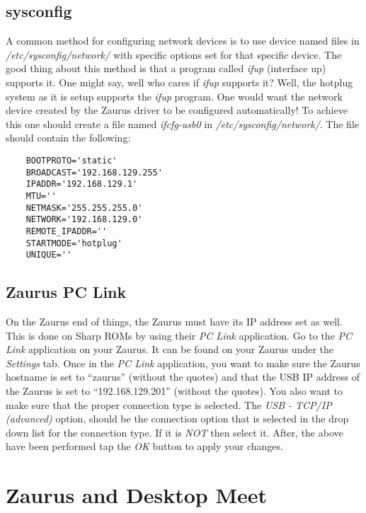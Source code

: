 \documentclass{article}
\begin{document}
    \subsection{sysconfig}

    A common method for configuring network devices is to use device named
    files in \emph{/etc/sysconfig/network/} with specific options set for
    that specific device. The good thing about this method is that a program
    called \emph{ifup} (interface up) supports it. One might say, well who
    cares if \emph{ifup} supports it? Well, the hotplug system as it is
    setup supports the \emph{ifup} program. One would want the network
    device created by the Zaurus driver to be configured
    automatically! To achieve this one should create a file named
    \emph{ifcfg-usb0} in \emph{/etc/sysconfig/network/}. The file should
    contain the following:

    \begin{verbatim}
    BOOTPROTO='static'
    BROADCAST='192.168.129.255'
    IPADDR='192.168.129.1'
    MTU=''
    NETMASK='255.255.255.0'
    NETWORK='192.168.129.0'
    REMOTE_IPADDR=''
    STARTMODE='hotplug'
    UNIQUE=''
    \end{verbatim}

    \subsection{Zaurus PC Link}

    On the Zaurus end of things, the Zaurus must have its IP address set as
    well. This is done on Sharp ROMs by using their \emph{PC Link}
    application. Go to the \emph{PC Link} application on your Zaurus. It can
    be found on your Zaurus under the \emph{Settings} tab. Once in the
    \emph{PC Link} application, you want to make sure the Zaurus hostname is
    set to ``zaurus'' (without the quotes) and that the USB IP address of the
    Zaurus is set to ``192.168.129.201'' (without the quotes). You also want
    to make sure that the proper connection type is selected. The \emph{USB -
    TCP/IP (advanced)} option, should be the connection option that is
    selected in the drop down list for the connection type. If it is
    \emph{NOT} then select it. After, the above have been performed tap the
    \emph{OK} button to apply your changes.

\section{Zaurus and Desktop Meet}
\end{document}
